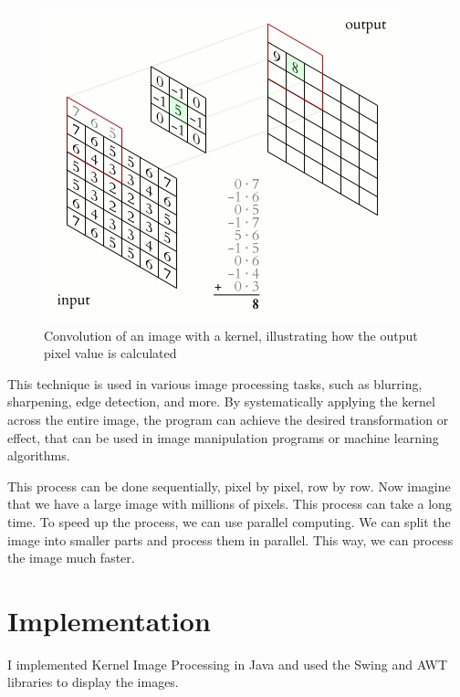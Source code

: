 \documentclass{article}
\begin{document}
\begin{multicols}{2}
    \begin{figure}[H]
        \centering
        \includegraphics[width=\linewidth]{img/kernel.jpg}
        \caption{Convolution of an image with a kernel, illustrating how the output pixel value is calculated}
        \label{fig:Kernel}
    \end{figure}

    This technique is used in various image processing tasks, such as blurring, sharpening, edge detection, and more. By systematically applying the kernel across the entire image, the program can achieve the desired transformation or effect, that can be used in image manipulation programs or machine learning algorithms.


    This process can be done sequentially, pixel by pixel, row by row. Now imagine that we have a large image with millions of pixels. This process can take a long time. To speed up the process, we can use parallel computing. We can split the image into smaller parts and process them in parallel. This way, we can process the image much faster.

    \section{Implementation}
    I implemented Kernel Image Processing in Java and used the Swing and AWT libraries to display the images.


\end{multicols}
\end{document}
